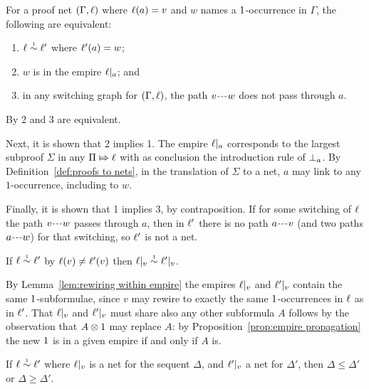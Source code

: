 \documentclass[conference]{IEEEtran}
\begin{document}
\begin{lemma}
\label{lem:rewiring within empire}
For a proof net $(\Gamma,\ell)$ where $\ell(a)=v$ and $w$ names a $1$-occurrence in $\Gamma$, the following are equivalent:
%
\begin{enumerate}
	\item
$\links\perm*\links'$ where $\ell'(a)=w$;
	\item
$w$ is in the empire $\emp a$; and
	\item
in any switching graph for $(\Gamma,\ell)$, the path $\path vw$ does not pass through $a$.
\end{enumerate}
\end{lemma}


\begin{IEEEproof}
By \cite[Proposition 2.a]{Bellin-vandeWiele-1995} 2 and 3 are equivalent.

Next, it is shown that 2 implies 1.
%
The empire $\emp a$ corresponds to the largest subproof $\Sigma$ in any $\Pi\Mapsto\ell$ with as conclusion the introduction rule of $\bot_{a}$.
%
By Definition~\ref{def:proofs to nets}, in the translation of $\Sigma$ to a net, $a$ may link to any $1$-occurrence, including to $w$.



Finally, it is shown that 1 implies 3, by contraposition.
%
If for some switching of $\ell$ the path $\path vw$ passes through $a$, then in $\ell'$ there is no path $\path av$ (and two paths $\path aw$) for that switching, so $\ell'$ is not a net.
%
\end{IEEEproof}


\begin{lemma}
\label{lem:rewiring preserves empire}
If $\links\perm*\links'$ by $\ell(v)\neq\ell'(v)$ then $\emp v\perm*\emp*v$.
\end{lemma}

\begin{IEEEproof}
By Lemma~\ref{lem:rewiring within empire} the empires $\emp v$ and $\emp*v$ contain the same $1$-subformulae, since $v$ may rewire to exactly the same $1$-occurrences in $\ell$ as in $\ell'$.
%
That $\emp v$ and $\emp*v$ must share also any other subformula $A$ follows by the observation that $A\otimes1$ may replace $A$: by Proposition~\ref{prop:empire propagation} the new $1$ is in a given empire if and only if $A$ is.
%
\end{IEEEproof}


\begin{lemma}
\label{lem:rewiring affects empires}
If $\links\perm*\links'$ where $\emp v$ is a net for the sequent $\Delta$, and $\emp*v$ a net for $\Delta'$, then $\Delta\leq\Delta'$ or $\Delta\geq\Delta'$.
\end{lemma}
\end{document}
